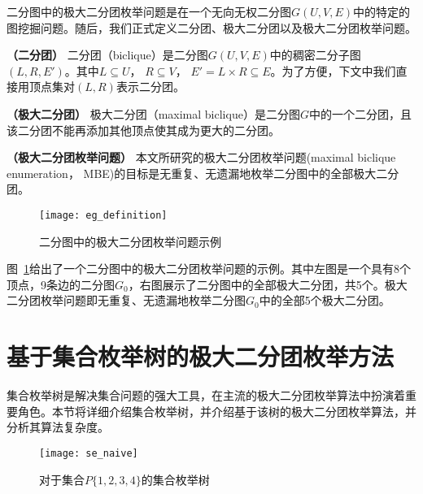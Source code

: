   二分图中的极大二分团枚举问题是在一个无向无权二分图$G(U,V,E)$中的特定的图挖掘问题。随后，我们正式定义二分团、极大二分团以及极大二分团枚举问题。

\begin{definition}
  \textbf{（二分团）} 二分团（biclique）是二分图$G(U,V,E)$中的稠密二分子图$(L,R,E')$。其中$L\subseteq U$， $R\subseteq V$， $E' = L \times R \subseteq E$。为了方便，下文中我们直接用顶点集对$(L,R)$表示二分团。
\end{definition}

\begin{definition}
  \textbf{（极大二分团）} 极大二分团（maximal biclique）是二分图$G$中的一个二分团，且该二分团不能再添加其他顶点使其成为更大的二分团。
  \label{def:mb}
\end{definition}

\begin{definition}
  \textbf{（极大二分团枚举问题）} 本文所研究的极大二分团枚举问题(maximal biclique enumeration， MBE)的目标是无重复、无遗漏地枚举二分图中的全部极大二分团。
\end{definition}

\begin{figure} [ht]
  \vspace{0.2 in}
  \centering
  \texttt{[image: eg\_definition]}
  \vspace{0.1 in}
  \caption{二分图中的极大二分团枚举问题示例}
  \label{fig:eg_definition}
\end{figure}

\begin{example}
  图~\ref{fig:eg_definition}给出了一个二分图中的极大二分团枚举问题的示例。其中左图是一个具有8个顶点，9条边的二分图$G_0$，右图展示了二分图中的全部极大二分团，共5个。极大二分团枚举问题即无重复、无遗漏地枚举二分图$G_0$中的全部5个极大二分团。
  
\end{example}

\section{基于集合枚举树的极大二分团枚举方法}
\label{sec:se}


集合枚举树是解决集合问题的强大工具，在主流的极大二分团枚举算法中扮演着重要角色。本节将详细介绍集合枚举树，并介绍基于该树的极大二分团枚举算法，并分析其算法复杂度。


\begin{figure} [ht]
  \vspace{0.1 in}
  \centering
  \texttt{[image: se\_naive]}
  \vspace{0.15 in}
  \caption{对于集合$P\{1,2,3,4\}$的集合枚举树}
  \label{fig:se_naive}
\end{figure}




